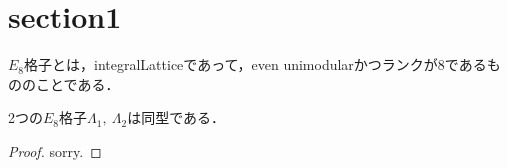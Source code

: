 %

\section{section1}
\begin{definition}
  \label{def:E8Lattice}
  \leanok
  $E_8$格子とは，integralLatticeであって，even unimodularかつランクが$8$であるもののことである．
\end{definition}

\begin{theorem}
  \label{thm:unique}
  \leanok
  2つの$E_8$格子$\Lambda_1,\ \Lambda_2$は同型である．
\end{theorem}

\begin{proof}
  sorry.
\end{proof}

